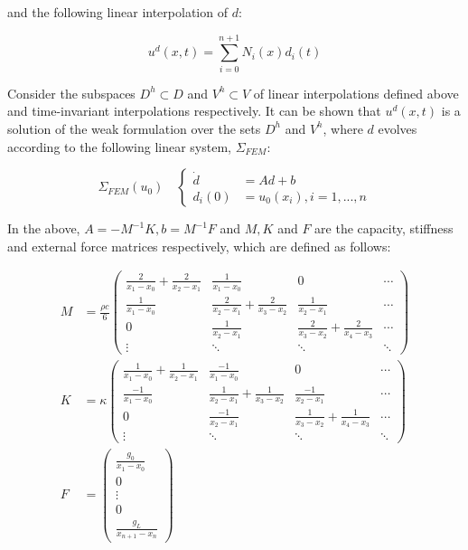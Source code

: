 \documentclass[oribibl]{llncs/llncs}
\begin{document}
and the following linear interpolation of $d$:

\begin{equation}
    u^d(x, t) = \sum_{i=0}^{n+1} N_i(x) d_i(t)
\end{equation}

Consider the subspaces $D^h \subset D$ and $V^h \subset V$ of linear
interpolations defined above and time-invariant interpolations respectively.
It can be shown that $u^d(x, t)$ is a solution of the weak formulation over the
sets $D^h$ and $V^h$, where $d$ evolves
according to the following linear system, $\Sigma_{FEM}$:

\begin{equation}\label{eq:fem}
    \Sigma_{FEM}(u_0) \quad \left \{
    \begin{aligned}
        \dot{d} &= A d + b \\
        d_i(0) &= u_0(x_i), i = 1,...,n
    \end{aligned}
    \right.
\end{equation}

In the above, $A = -M^{-1}K, b = M^{-1} F$ and $M, K$ and $F$ are the capacity,
stiffness and external force matrices respectively, which are defined as
follows:

    \begin{align}
        M &= \frac{\rho c}{6} \begin{pmatrix}
            \frac{2}{x_1 - x_0} + \frac{2}{x_2 - x_1} & \frac{1}{x_1 - x_0}  & 0 & \cdots \\ 
            \frac{1}{x_1 - x_0} & \frac{2}{x_2 - x_1} + \frac{2}{x_3 - x_2} & \frac{1}{x_2 - x_1}  & \cdots \\ 
            0 & \frac{1}{x_2 - x_1} & \frac{2}{x_3 - x_2} + \frac{2}{x_4 - x_3} &  \cdots \\ 
            \vdots & \ddots & \ddots & \ddots 
        \end{pmatrix}  \\
        K &= \kappa \begin{pmatrix}
            \frac{1}{x_1 - x_0} + \frac{1}{x_2 - x_1} & \frac{-1}{x_1 - x_0}  & 0 & \cdots \\ 
            \frac{-1}{x_1 - x_0} & \frac{1}{x_2 - x_1} + \frac{1}{x_3 - x_2} & \frac{-1}{x_2 - x_1}  & \cdots \\ 
            0 & \frac{-1}{x_2 - x_1} & \frac{1}{x_3 - x_2} + \frac{1}{x_4 - x_3} &  \cdots \\ 
            \vdots & \ddots & \ddots & \ddots 
        \end{pmatrix} \\
        F &= \begin{pmatrix}
            \frac{g_0}{x_1 - x_0} \\
            0 \\
            \vdots \\
            0 \\
            \frac{g_L}{x_{n+1} - x_{n}}
        \end{pmatrix} 
    \end{align}
\end{document}
